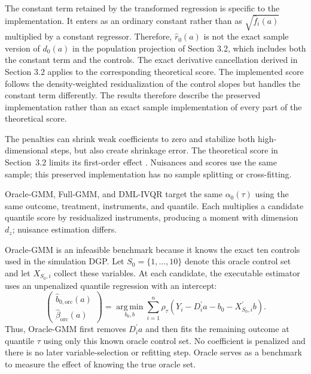 The constant term retained by the transformed regression is specific to the implementation. It enters as an ordinary constant rather than as \(\sqrt{\widehat f_i(a)}\) multiplied by a constant regressor. Therefore, \(\widehat r_0(a)\) is not the exact sample version of \(d_0(a)\) in the population projection of Section 3.2, which includes both the constant term and the controls. The exact derivative cancellation derived in Section 3.2 applies to the corresponding theoretical score. The implemented score follows the density-weighted residualization of the control slopes but handles the constant term differently. The results therefore describe the preserved implementation rather than an exact sample implementation of every part of the theoretical score.

The penalties can shrink weak coefficients to zero and stabilize both high-dimensional steps, but also create shrinkage error. The theoretical score in Section~3.2 limits its first-order effect \parencite{chernozhukov_et_al_2018}. Nuisances and scores use the same sample; this preserved implementation has no sample splitting or cross-fitting.

Oracle-GMM, Full-GMM, and DML-IVQR target the same $\alpha_0(\tau)$ using the same outcome, treatment, instruments, and quantile. Each multiplies a candidate quantile score by residualized instruments, producing a moment with dimension $d_z$; nuisance estimation differs.

Oracle-GMM is an infeasible benchmark because it knows the exact ten controls used in the simulation DGP. Let $S_0=\{1,\ldots,10\}$ denote this oracle control set and let $X_{S_0,i}$ collect these variables. At each candidate, the executable estimator uses an unpenalized quantile regression with an intercept:
\begin{equation}
    \begin{pmatrix}
        \widehat b_{0,\mathrm{orc}}(a)\\
        \widehat\beta_{\mathrm{orc}}(a)
    \end{pmatrix}
    =
    \operatorname*{arg\,min}_{b_0,b}
    \sum_{i=1}^{n}
    \rho_{\tau}\!\left(
        Y_i-D_i^{\prime}a-b_0-X_{S_0,i}^{\prime}b
    \right).
    \label{eq:oracle-beta}
\end{equation}
Thus, Oracle-GMM first removes $D_i^{\prime}a$ and then fits the remaining outcome at quantile $\tau$ using only this known oracle control set. No coefficient is penalized and there is no later variable-selection or refitting step. Oracle serves as a benchmark to measure the effect of knowing the true oracle set.


